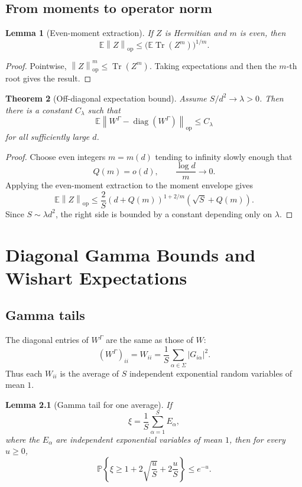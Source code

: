 \documentclass[11pt,oneside]{book}
\newtheorem{theorem}{Theorem}[chapter]
\newtheorem{lemma}[theorem]{Lemma}
\DeclareMathOperator{\Tr}{Tr}
\DeclareMathOperator{\diag}{diag}
\newcommand{\E}{\mathbb E}
\newcommand{\Prob}{\mathbb P}
\newcommand{\1}{\mathbf 1}
\newcommand{\GammaPT}{\Gamma}
\newcommand{\op}{\mathrm{op}}
\newcommand{\norm}[1]{\left\|#1\right\|}
\begin{document}
\section{From moments to operator norm}

\begin{lemma}[Even-moment extraction]
If \(Z\) is Hermitian and \(m\) is even, then
\[
  \E\norm Z_{\op}
  \le
  \bigl(\E\Tr(Z^m)\bigr)^{1/m}.
\]
\end{lemma}

\begin{proof}
Pointwise, \(\norm Z_{\op}^m\le\Tr(Z^m)\).  Taking expectations and then the
\(m\)-th root gives the result.
\end{proof}

\begin{theorem}[Off-diagonal expectation bound]
Assume \(S/d^2\to\lambda>0\).  Then there is a constant \(C_\lambda\) such
that
\[
  \E\norm{W^{\GammaPT}-\diag(W^{\GammaPT})}_{\op}
  \le
  C_\lambda
\]
for all sufficiently large \(d\).
\end{theorem}

\begin{proof}
Choose even integers \(m=m(d)\) tending to infinity slowly enough that
\[
  Q(m)=o(d),
  \qquad
  \frac{\log d}{m}\to0.
\]
Applying the even-moment extraction to the moment envelope gives
\[
  \E\norm Z_{\op}
  \le
  \frac2S(d+Q(m))^{1+2/m}(\sqrt S+Q(m)).
\]
Since \(S\sim\lambda d^2\), the right side is bounded by a constant depending
only on \(\lambda\).
\end{proof}

\chapter{Diagonal Gamma Bounds and Wishart Expectations}

\section{Gamma tails}

The diagonal entries of \(W^{\GammaPT}\) are the same as those of \(W\):
\[
  (W^{\GammaPT})_{ii}
  =
  W_{ii}
  =
  \frac1S\sum_{\alpha\in\Sigma}|G_{i\alpha}|^2.
\]
Thus each \(W_{ii}\) is the average of \(S\) independent exponential random
variables of mean \(1\).

\begin{lemma}[Gamma tail for one average]
If
\[
  \xi=\frac1S\sum_{\alpha=1}^S E_\alpha,
\]
where the \(E_\alpha\) are independent exponential variables of mean \(1\),
then for every \(u\ge0\),
\[
  \Prob\left\{\xi\ge1+2\sqrt{\frac uS}+2\frac uS\right\}
  \le e^{-u}.
\]
\end{lemma}
\end{document}
